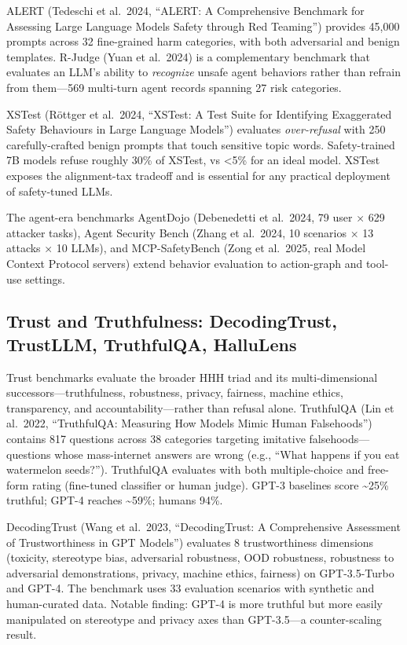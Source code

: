 \documentclass{article}
\begin{document}
ALERT (Tedeschi et al.~2024, ``ALERT: A Comprehensive Benchmark for Assessing Large Language Models Safety through Red Teaming'') provides 45,000 prompts across 32 fine-grained harm categories, with both adversarial and benign templates. R-Judge (Yuan et al.~2024) is a complementary benchmark that evaluates an LLM's ability to \emph{recognize} unsafe agent behaviors rather than refrain from them---569 multi-turn agent records spanning 27 risk categories.

XSTest (Röttger et al.~2024, ``XSTest: A Test Suite for Identifying Exaggerated Safety Behaviours in Large Language Models'') evaluates \emph{over-refusal} with 250 carefully-crafted benign prompts that touch sensitive topic words. Safety-trained 7B models refuse roughly 30\% of XSTest, vs \textless5\% for an ideal model. XSTest exposes the alignment-tax tradeoff and is essential for any practical deployment of safety-tuned LLMs.

The agent-era benchmarks AgentDojo (Debenedetti et al.~2024, 79 user × 629 attacker tasks), Agent Security Bench (Zhang et al.~2024, 10 scenarios × 13 attacks × 10 LLMs), and MCP-SafetyBench (Zong et al.~2025, real Model Context Protocol servers) extend behavior evaluation to action-graph and tool-use settings.

\subsection{Trust and Truthfulness: DecodingTrust, TrustLLM, TruthfulQA, HalluLens}\label{trust-and-truthfulness-decodingtrust-trustllm-truthfulqa-hallulens}

Trust benchmarks evaluate the broader HHH triad and its multi-dimensional successors---truthfulness, robustness, privacy, fairness, machine ethics, transparency, and accountability---rather than refusal alone. TruthfulQA (Lin et al.~2022, ``TruthfulQA: Measuring How Models Mimic Human Falsehoods'') contains 817 questions across 38 categories targeting imitative falsehoods---questions whose mass-internet answers are wrong (e.g., ``What happens if you eat watermelon seeds?''). TruthfulQA evaluates with both multiple-choice and free-form rating (fine-tuned classifier or human judge). GPT-3 baselines score \textasciitilde25\% truthful; GPT-4 reaches \textasciitilde59\%; humans 94\%.

DecodingTrust (Wang et al.~2023, ``DecodingTrust: A Comprehensive Assessment of Trustworthiness in GPT Models'') evaluates 8 trustworthiness dimensions (toxicity, stereotype bias, adversarial robustness, OOD robustness, robustness to adversarial demonstrations, privacy, machine ethics, fairness) on GPT-3.5-Turbo and GPT-4. The benchmark uses 33 evaluation scenarios with synthetic and human-curated data. Notable finding: GPT-4 is more truthful but more easily manipulated on stereotype and privacy axes than GPT-3.5---a counter-scaling result.
\end{document}
